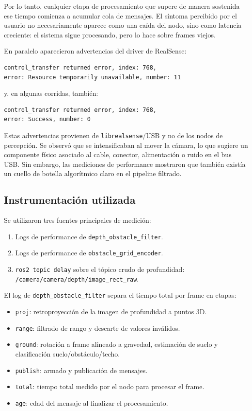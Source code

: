 Por lo tanto, cualquier etapa de procesamiento que supere de manera sostenida
ese tiempo comienza a acumular cola de mensajes. El síntoma percibido por el
usuario no necesariamente aparece como una caída del nodo, sino como latencia
creciente: el sistema sigue procesando, pero lo hace sobre frames viejos.

En paralelo aparecieron advertencias del driver de RealSense:

\begin{verbatim}
control_transfer returned error, index: 768,
error: Resource temporarily unavailable, number: 11
\end{verbatim}

y, en algunas corridas, también:

\begin{verbatim}
control_transfer returned error, index: 768,
error: Success, number: 0
\end{verbatim}

Estas advertencias provienen de \texttt{librealsense}/USB y no de los nodos de
percepción. Se observó que se intensificaban al mover la cámara, lo que sugiere
un componente físico asociado al cable, conector, alimentación o ruido en el
bus USB. Sin embargo, las mediciones de performance mostraron que también
existía un cuello de botella algorítmico claro en el pipeline filtrado.

\subsection{Instrumentación utilizada}
\label{subsec:perf-instrumentacion}

Se utilizaron tres fuentes principales de medición:

\begin{enumerate}
  \item Logs de performance de \texttt{depth\_obstacle\_filter}.
  \item Logs de performance de \texttt{obstacle\_grid\_encoder}.
  \item \texttt{ros2 topic delay} sobre el tópico crudo de profundidad:
        \texttt{/camera/camera/depth/image\_rect\_raw}.
\end{enumerate}

El log de \texttt{depth\_obstacle\_filter} separa el tiempo total por frame en
etapas:

\begin{itemize}
  \item \texttt{proj}: retroproyección de la imagen de profundidad a puntos 3D.
  \item \texttt{range}: filtrado de rango y descarte de valores inválidos.
  \item \texttt{ground}: rotación a frame alineado a gravedad, estimación de
        suelo y clasificación suelo/obstáculo/techo.
  \item \texttt{publish}: armado y publicación de mensajes.
  \item \texttt{total}: tiempo total medido por el nodo para procesar el frame.
  \item \texttt{age}: edad del mensaje al finalizar el procesamiento.
\end{itemize}

